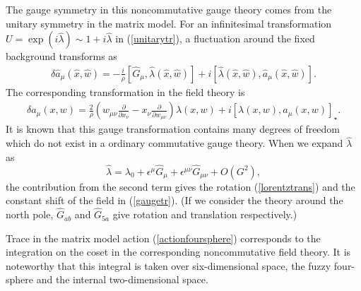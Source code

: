 \documentclass[a4paper,11pt]{article}
\begin{document}
The gauge symmetry in this noncommutative 
gauge theory comes from the unitary symmetry in 
the matrix model. 
For an infinitesimal transformation 
$U=\exp(i\hat{\lambda}) \sim 1+i\hat{\lambda}$ 
in (\ref{unitarytr}), 
a fluctuation around the fixed background 
transforms as 
\begin{eqnarray}
\delta \hat{a}_{\mu}(\hat{x},\hat{w}) 
=-\frac{i}{\rho}
[\hat{G}_{\mu},\hat{\lambda}(\hat{x},\hat{w})]
+i[\hat{\lambda}(\hat{x},\hat{w}),
\hat{a}_{\mu}(\hat{x},\hat{w})]. 
\label{gaugetr}
\end{eqnarray} 
The corresponding transformation in the field theory is 
\begin{eqnarray}
\delta a_{\mu}(x,w) 
=\frac{2}{\rho}
\left(
w_{\mu\nu}\frac{\partial}{\partial x_{\nu}}
- x_{\nu}\frac{\partial}{\partial w_{\mu\nu}}
\right) 
\lambda(x,w)
+i[\lambda(x,w),
a_{\mu}(x,w)]_{\star}. 
\end{eqnarray} 
It is known that this gauge transformation contains many 
degrees of freedom which do not exist 
in a ordinary commutative gauge theory. 
When we expand $\hat{\lambda}$ as 
\begin{equation}
\hat{\lambda}=\lambda_{0}+\epsilon^{\mu}\hat{G}_{\mu}
+\epsilon^{\mu\nu}\hat{G}_{\mu\nu}+O\left(G^{2}\right), 
\end{equation}
the contribution from the second term 
gives the rotation (\ref{lorentztrans})
and the constant shift of the field in (\ref{gaugetr}).  
(If we consider the theory around the north pole, $\hat{G}_{ab}$ and 
$\hat{G}_{5a}$ give rotation and translation respectively.)

Trace in the matrix model action (\ref{actionfoursphere}) 
corresponds to 
the integration on the coset in 
the corresponding noncommutative field theory.
It is noteworthy that this integral is taken over 
six-dimensional space, the fuzzy four-sphere and 
the internal two-dimensional space. 
\end{document}
